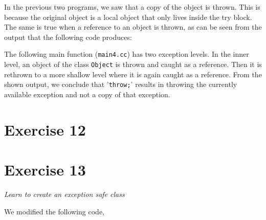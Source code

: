 \documentclass[12pt]{article}
\newcommand{\desc}[1]{\textit{#1} \vspace{1em}}
\begin{document}
\vspace{0.5cm}
In the previous two programs, we saw that a copy of the object is thrown. This is because the original object is a local object that only lives inside the try block. The same is true when a reference to an object is thrown, as can be seen from the output that the following code produces:



\vspace{0.5cm}
The following main function (\texttt{main4.cc}) has two exception levels. In the inner level, an object of the class \texttt{Object} is thrown and caught as a reference. Then it is rethrown to a more shallow level where it is again caught as a reference. From the shown output, we conclude that '\texttt{throw;}' results in throwing the currently available exception and not a copy of that exception.




\clearpage
\section*{Exercise 12}
\desc{}

\clearpage
\section*{Exercise 13}
\desc{Learn to create an exception safe class}

We modified the following code,













\clearpage
\end{document}
